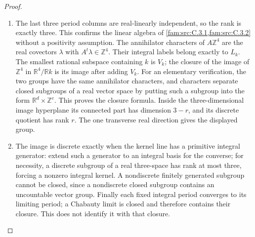 \begin{proof}
\begin{enumerate}[label=\arabic*.,leftmargin=*]
\item The last three period columns are real-linearly independent, so the
rank is exactly three. This confirms the linear algebra of \cref{fam:src:C.3.1,fam:src:C.3.2}
without a positivity assumption. The annihilator characters of
\(A\mathbb Z^4\) are the real covectors \(\lambda\) with
\(A^t\lambda\in\mathbb Z^4\). Their integral labels belong exactly
to \(L_k\). The smallest rational subspace containing \(k\) is
\(V_k\); the closure of the image of \(\mathbb Z^4\) in
\(\mathbb R^4/\mathbb R k\) is its image after adding \(V_k\).
For an elementary verification, the two groups have the same
annihilator characters, and characters separate closed subgroups of
a real vector space by putting such a subgroup into the form
\(\mathbb R^d\times\mathbb Z^e\). This proves the closure formula.
Inside the three-dimensional image hyperplane its connected part
has dimension \(3-r\), and its discrete quotient has rank \(r\).
The one transverse real direction gives the displayed group.

\item The image is discrete exactly when the kernel line has a primitive
integral generator: extend such a generator to an integral basis for
the converse; for necessity, a discrete subgroup of a real
three-space has rank at most three, forcing a nonzero integral
kernel. A nondiscrete finitely generated subgroup cannot be closed,
since a nondiscrete closed subgroup contains an uncountable vector
group. Finally each fixed integral period converges to its limiting
period; a Chabauty limit is closed and therefore contains their
closure. This does not identify it with that closure.
\end{enumerate}
\end{proof}

